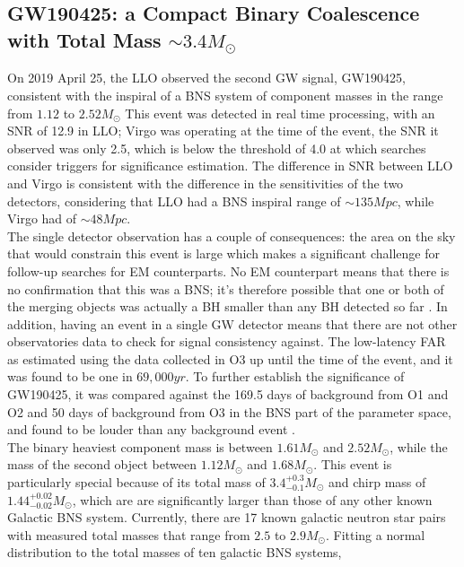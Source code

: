\documentclass[binding=0.6cm, LaM]{sapthesis}
\begin{document}
\subsection{GW190425: a Compact Binary Coalescence with Total Mass $\sim 3.4M_\odot$}

	On 2019 April 25, the LLO observed the second GW signal, GW190425, 
	consistent with the inspiral of a BNS system of component masses in the range from $1.12$ to $2.52 M_\odot$ 
	This event was detected in real time processing, with an SNR of 12.9 in LLO; 
	Virgo was operating at the time of the event, the SNR it observed was only 2.5, 
	which is below the threshold of 4.0 at which searches consider triggers for significance estimation. 
	The difference in SNR between LLO and Virgo is consistent with the difference 
	in the sensitivities of the two detectors, considering that LLO had 
	a BNS inspiral range of $\sim135 Mpc$, while Virgo had of $\sim48 Mpc$. \\
	The single detector observation has a couple of consequences: 
	the area on the sky that would constrain this event is large which 	
	makes a significant challenge for follow-up searches for EM counterparts. 
	No EM counterpart means that there is no confirmation that this was a BNS; 
	it’s therefore possible that one or both of the merging objects was actually 
	a BH smaller than any BH detected so far \cite{148}.
	In addition, having an event in a single GW detector means that there are not other 
	observatories data to check for signal consistency against. 
	The low-latency FAR as estimated using the data collected in O3 
	up until the time of the event, and it was found to be one in $69,000 yr$. 
	To further establish the significance of GW190425, it was compared against the 169.5 
	days of background from O1 and O2 and 50 days of background 
	from O3 in the BNS part of the parameter space, and found to be 
	louder than any background event \cite{148}. \\
	The binary heaviest component mass is between $1.61M_\odot$ and $2.52 M_\odot$, 
	while the mass of the second object between $1.12M_\odot$ and $1.68 M_\odot$.
	This event is particularly special because of its total mass of $3.4^{+0.3}_{-0.1} M_\odot$ 
	and chirp mass of $1.44^{+0.02}_{-0.02}M_\odot$, which are are significantly larger 
	than those of any other known Galactic BNS system. 
	Currently, there are 17 known galactic neutron star pairs with measured total masses 
	that range from $2.5$ to $2.9 M_\odot$. 
	Fitting a normal distribution to the total masses of ten galactic BNS systems, 
\end{document}

